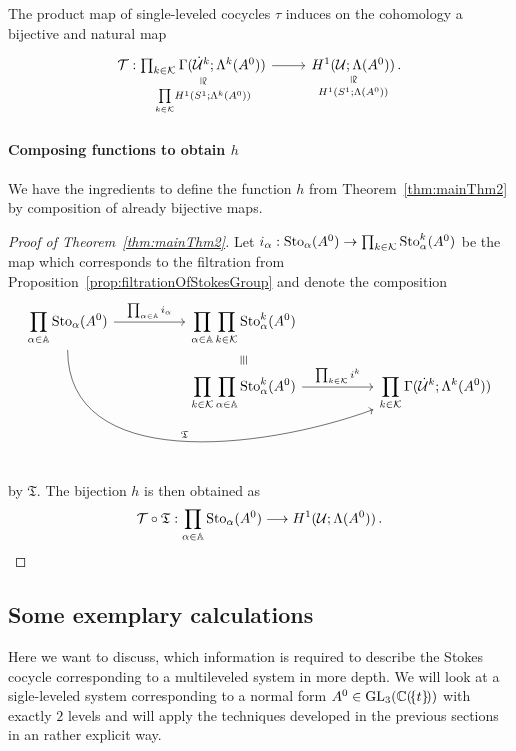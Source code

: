 \begin{cor}
  The product map of single-leveled cocycles $\tau$ induces on the cohomology
  a bijective and natural map
  \[ \begin{tikzcd}
    \cT:
    \underset{\underset{k\in\cK}\prod H^1(S^1;\Lambda^k(A^0))}{%
      \underset{\text{\rotatebox[origin=c]{-90}{$\cong$}}}{%
        \prod_{k\in\cK}\Gamma(\dot\cU^k;\Lambda^k(A^0))}}
    \rar&
    \underset{H^1(S^1;\Lambda(A^0))}{%
      \underset{\text{\rotatebox[origin=c]{-90}{$\cong$}}}{%
        H^1(\cU;\Lambda(A^0))}}\,.
  \end{tikzcd} \]
\end{cor}
\paragraph{Composing functions to obtain $h$}
We have the ingredients to define the function $h$ from
Theorem~\ref{thm:mainThm2} by composition of already bijective maps.
\begin{proof}[Proof of Theorem~\ref{thm:mainThm2}]
  Let $i_\alpha:\operatorname{Sto}_\alpha(A^0)\to\prod_{k\in\mathcal{K}}\operatorname{Sto}_\alpha^k(A^0)$ be the
  map which corresponds to the filtration from
  Proposition~\ref{prop:filtrationOfStokesGroup} and
  denote the composition
  \[ \begin{tikzcd}[column sep=1.8cm,row sep=0]
      \displaystyle \prod_{\alpha\in\A}\Sto_\alpha(A^0)
      \rar{\prod_{\alpha\in\A}i_\alpha}
      \arrow[ddrr, out=270,in=200,"\mathfrak{T}"]
      &
      \displaystyle \prod_{\alpha\in\A}\prod_{k\in\cK}\Sto_\alpha^k(A^0)
    \\&\text{\rotatebox[origin=c]{-90}{$\equiv$}}
    \\&\displaystyle \prod_{k\in\cK}\prod_{\alpha\in\A}\Sto_\alpha^k(A^0)
      \rar{\prod_{k\in\cK}i^k}&
      \displaystyle \prod_{k\in\cK}\Gamma(\dot\cU^k;\Lambda^k(A^0))
  \end{tikzcd} \]
  by $\mathfrak{T}$. The bijection $h$ is then obtained as
  \[
    \mathcal{T}\circ\mathfrak{T}: \prod_{\alpha\in\mathbb{A}}\operatorname{Sto}_\alpha(A^0)
    \longrightarrow H^1(\mathcal{U};\Lambda(A^0)) \,.
  \]
\end{proof}

\subsection{Some exemplary calculations}\label{chp:WhichInformationIsNeeded}
Here we want to discuss, which information is required to describe the Stokes
cocycle corresponding to a multileveled system in more depth.
We will look at a sigle-leveled system corresponding to a normal form
$A^0\in \operatorname{GL}_3(\mathbb{C}(\!\{t\}\!))$ with exactly $2$ levels and will apply the
techniques developed in the previous sections in an rather explicit way.

